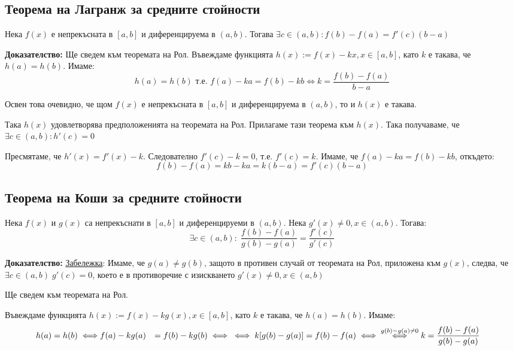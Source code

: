 \documentclass{article}
\renewcommand{\\}{\newline}
\newcommand{\doc}{\textbf{Доказателство: }}
\begin{document}
\subsection{Теорема на Лагранж за средните стойности}
Нека \(f(x)\) е непрекъсната в \([a, b]\) и диференцируема в \((a, b)\). Тогава \(\exists c \in (a, b): f(b) - f(a) = f'(c)(b-a)\) 

\doc Ще сведем към теоремата на Рол. Въвеждаме функцията \(h(x)  := f(x) - kx, x \in [a, b]\), като \(k\) е такава, че \(h(a) = h(b)\). 
Имаме: \[
  h(a) = h(b) \text{ т.е. }f(a) - ka = f(b) - kb \iff k = \frac{f(b) - f(a)}{b -a}
\] 

Освен това очевидно, че щом \(f(x) \) е непрекъсната в \([a, b]\) и диференцируема в \((a, b)\), то и \(h(x)\) е такава. 

Така \(h(x)\) удовлетворява предположенията на теоремата на Рол. Прилагаме тази теорема към \(h(x)\). Така получаваме, че \(\exists c \in (a, b): h'(c) = 0\) 

Пресмятаме, че \(h'(x) = f'(x) -k\). Следователно \(f'(c) - k = 0\), т.е. \(f'(c) = k\). Имаме, че \(f(a) - ka = f(b) - kb\), откъдето:
\[
  f(b) - f(a) = kb - ka = k(b-a) = f'(c)(b-a)
\] 
\subsection{Теорема на Коши за средните стойности} Нека \(f(x)\) и \(g(x)\) са непрекъснати в \([a, b]\) и диференцируеми в \((a, b)\). Нека \(g'(x) \not= 0, x \in (a, b)\). Тогава: \[
  \exists c \in (a, b):\; \frac{f(b) - f(a)}{g(b) - g(a)} = \frac{f'(c)}{g'(c)}      
\]      

\doc \underline{Забележка}: Имаме, че \(g(a) \not= g(b)\), защото в противен случай от теоремата на Рол, приложена към \(g(x)\), следва, че \(\exists c \in (a, b)\; g'(c) = 0\), което е в противоречие с изискването \(g'(x) \not= 0, x \in (a, b)\)   

Ще сведем към теоремата на Рол.

Въвеждаме функцията \(h(x) := f(x) - kg(x), x\in[a,b]\), като \(k\) е такава, че \(h(a) = h(b)\). Имаме:
\begin{align*}
  h(a) = h(b) &\iff \\ 
  f(a) - kg(a) &= f(b) - kg(b) \iff\\ 
  \iff k[g(b) - g(a)] &= f(b) - f(a) \iff \\ 
  \overset{g(b) - g(a) \not= 0}{\iff} k = \frac{f(b) - f(a)}{g(b) - g(a)}
\end{align*}
\end{document}

